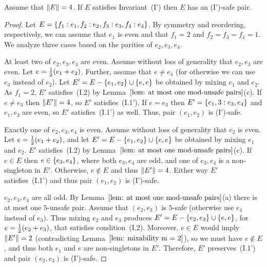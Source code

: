 
\begin{lemma}%
	\label{lem: m = 4, preserves invariant, n = 5}
	Assume that ${\|E\|}=4$.
	If $E$ satisfies Invariant~(I') then $E$ has an (I')-safe pair.
\end{lemma}%

\begin{proof}
	Let $E = { \left\{ f_1:e_1, f_2:e_2, f_3:e_3, f_4:e_4 \right\} }$.
	By symmetry and reordering, respectively, we can assume that $e_1$ is even
	and that $f_1 = 2$ and $f_2 = f_3 = f_4 = 1$. We analyze three cases based
	on the parities of $e_2,e_3,e_4$.
	
	\smallskip\noindent
	 At least two of $e_2,e_3,e_4$ are even.
	Assume without loss of generality that $e_2,e_3$ are even.
	Let $e = {\textstyle\frac{1}{2}} (e_1+e_2)$. Further, assume that $e \neq e_4$
	(for otherwise we can use $e_3$ instead of $e_2$).
	Let $E'  = E - { \left\{ e_1,e_2 \right\} } \cup { \left\{ e,e \right\} }$ be obtained by mixing $e_1$ and $e_2$.
	As $f_1 = 2$, $E'$ satisfies~(I.2) by Lemma~$\ref{lem: at most one mod-unsafe pairs}$(c).
	If $e\neq e_3$ then ${\|E'\|} = 4$, so $E'$ satisfies~(I.1').
	If $e = e_3$ then $E' = { \left\{ e_1,3:e_3,e_4 \right\} }$ and $e_1,e_3$ are even, so 
	$E'$ satisfies~(I.1') as well. Thus, pair $(e_1,e_2)$ is (I')-safe.
	
	\smallskip\noindent
	 Exactly one of $e_2,e_3,e_4$ is even.
	Assume without loss of generality that $e_2$ is even. Let $e={\textstyle\frac{1}{2}}(e_1+e_2)$, and
	let $E' = E - { \left\{ e_1,e_2 \right\} } \cup { \left\{ e,e \right\} }$ be obtained by mixing $e_1$ and $e_2$.
	$E'$ satisfies~(I.2) by Lemma~$\ref{lem: at most one mod-unsafe pairs}$(c).
	If $e\in E$ then $e\in{ \left\{ e_3,e_4 \right\} }$, where both $e_3,e_4$ are odd,
	and one of $e_3,e_4$ is a non-singleton in $E'$.
	Otherwise, $e\notin E$ and thus ${\|E'\|} = 4$.
	Either way $E'$ satisfies~(I.1') and thus pair $(e_1,e_2)$ is (I')-safe.

	\smallskip\noindent
	 $e_2,e_3,e_4$ are all odd.
	By Lemma~$\ref{lem: at most one mod-unsafe pairs}$(a)
	there is at most one $5$-unsafe pair. Assume that $(e_2,e_3)$ is $5$-safe
	(otherwise use $e_4$ instead of $e_3$).
	Thus mixing $e_2$ and $e_3$ produces $E' = E - { \left\{ e_2,e_3 \right\} } \cup { \left\{ e,e \right\} }$,
	for $e = {\textstyle\frac{1}{2}}(e_2+e_3)$, that satisfies condition~(I.2).
	Moreover, $e\in E$ would imply ${\|E'\|} = 2$
	(contradicting Lemma~$\ref{lem: mixability m = 2}$),
	so we must have $e \notin E$, and thus both $e_1$ and $e$ 
	are non-singletons in $E'$.
	Therefore, $E'$ preserves~(I.1') and pair $(e_2,e_3)$ is (I')-safe.
\end{proof}


